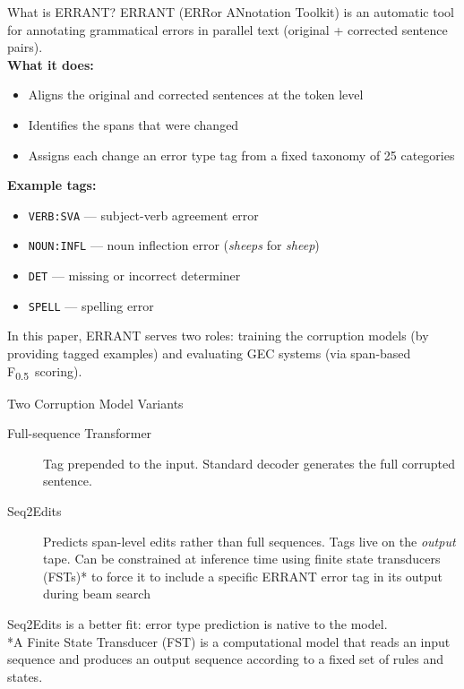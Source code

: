 \documentclass[aspectratio=169]{beamer}
\newcommand{\fhalf}{F\textsubscript{0.5}}
\newcommand{\errtag}[1]{\texttt{#1}}
\begin{document}
\begin{frame}{What is ERRANT?}
  ERRANT (ERRor ANnotation Toolkit) is an automatic tool for annotating
  grammatical errors in parallel text (original + corrected sentence pairs).\\[1.5em]

  \textbf{What it does:}
  \begin{itemize}
    \item Aligns the original and corrected sentences at the token level
    \item Identifies the spans that were changed
    \item Assigns each change an error type tag from a fixed taxonomy of 25 categories
  \end{itemize}

  \vspace{1em}
  \textbf{Example tags:}
  \begin{itemize}
    \item \errtag{VERB:SVA} — subject-verb agreement error
    \item \errtag{NOUN:INFL} — noun inflection error (\textit{sheeps} for \textit{sheep})
    \item \errtag{DET} — missing or incorrect determiner
    \item \errtag{SPELL} — spelling error
  \end{itemize}

  \vspace{1em}
  In this paper, ERRANT serves two roles: training the corruption models
  (by providing tagged examples) and evaluating GEC systems
  (via span-based \fhalf\ scoring).
\end{frame}



\begin{frame}{Two Corruption Model Variants}
  \begin{description}
    \item[Full-sequence Transformer] Tag prepended to the input.
      Standard decoder generates the full corrupted sentence.\\[1em]
    \item[Seq2Edits] Predicts span-level edits rather than full sequences.
      Tags live on the \emph{output} tape.
      Can be constrained at inference time using finite state transducers (FSTs)*
      to force it to include a specific ERRANT error tag in its output during beam search
  \end{description}

  \vspace{1em}
  Seq2Edits is a better fit: error type prediction is native to the model.\\
  \vspace{1em}
  *A Finite State Transducer (FST) is a computational model that reads an input sequence and produces an output sequence according to a fixed set of rules and states.
\end{frame}
\end{document}
